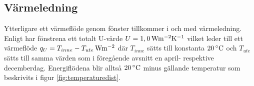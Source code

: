 \subsection{Värmeledning}

Ytterligare ett värmeflöde genom fönster tillkommer i och med värmeledning. Enligt \cite{petersarneo} har fönstrena ett totalt U-värde $U=\unit[1,0]{Wm^{-2}K^{-1}}$ vilket leder till ett värmeflöde $q_{U}=\unit[T_{inne}-T_{ute}]{Wm^{-2}}$ där $T_{inne}$ sätts till konstanta $\unit[20]{^{\circ}C}$ och $T_{ute}$ sätts till samma värden som i föregående avsnitt en april- respektive decemberdag. Energiflödena blir alltså $\unit[20]{^{\circ}C}$ minus gällande temperatur som beskrivits i figur \ref{fig:temperaturedist}.
